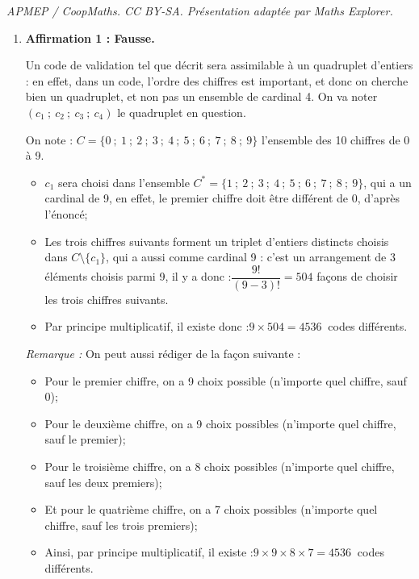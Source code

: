 \documentclass[10pt]{article}
\providecommand{\np}[2][]{{#2~#1}}
\begin{document}
\noindent\textit{APMEP / CoopMaths. CC BY-SA. Présentation adaptée par Maths Explorer.}\par\medskip
\medskip

	\begin{enumerate}
		\item \textbf{Affirmation 1 : Fausse.}

		Un code de validation tel que décrit sera assimilable à un quadruplet d'entiers : en effet, dans un code, l'ordre des chiffres est important, et donc on cherche bien un quadruplet, et non pas un ensemble de cardinal 4. On va noter $(c_1~;~c_2~;~c_3~;~c_4)$ le quadruplet en question.

		On note : $C = \big\{0~;~1~;~2~;~3~;~4~;~5~;~6~;~7~;~8~;~9\big\}$ l'ensemble des 10 chiffres de 0 à 9.

		\begin{itemize}
			\item $c_1$ sera choisi dans l'ensemble $C^* = \big\{1~;~2~;~3~;~4~;~5~;~6~;~7~;~8~;~9\big\}$, qui a un cardinal de 9, en effet, le premier chiffre doit être différent de 0, d'après l'énoncé;
			\item Les trois chiffres suivants forment un triplet d'entiers distincts choisis dans $C \setminus \big\{c_1\big\}$, qui a aussi comme cardinal 9 : c'est un arrangement de 3 éléments choisis parmi 9, il y a donc :\quad $\dfrac{9!}{(9 - 3)!} = 504$ façons de choisir les trois chiffres suivants.
			\item Par principe multiplicatif, il existe donc :\quad $9 \times 504 = \np{4536}$ codes différents.
		\end{itemize}

	\emph{Remarque :} On peut aussi rédiger de la façon suivante :
	\begin{itemize}
		\item Pour le premier chiffre, on a 9 choix possible (n'importe quel chiffre, sauf 0);
		\item 	Pour le deuxième chiffre, on a 9 choix possibles (n'importe quel chiffre, sauf le premier);
		\item 	Pour le troisième chiffre, on a 8 choix possibles (n'importe quel chiffre, sauf les deux premiers);
		\item 	Et pour le quatrième chiffre, on a 7 choix possibles (n'importe quel chiffre, sauf les trois premiers);
		\item 	Ainsi, par principe multiplicatif, il existe :\quad $ 9 \times 9 \times 8 \times 7 = \np{4536}$ codes  différents.
	\end{itemize}


\end{enumerate}
\end{document}
